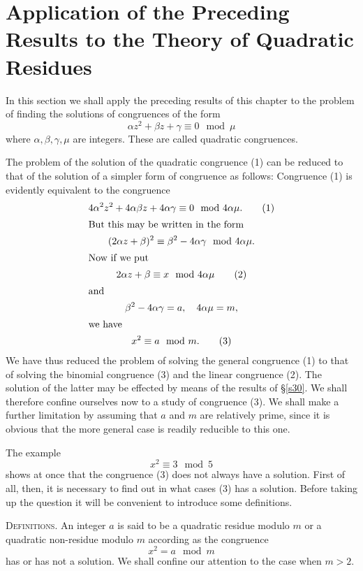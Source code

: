 \documentclass[oneside]{book}
\begin{document}
\section{Application of the Preceding Results to the Theory
of Quadratic Residues}\label{s31}

In this section we shall apply the preceding results of this chapter
to the problem of finding the solutions of congruences of the form
\begin{equation*}
\alpha z^2 + \beta z + \gamma \equiv 0 \mod \mu
\end{equation*}
where $\alpha, \beta, \gamma, \mu$ are integers. These are called
quadratic congruences.

The problem of the solution of the quadratic congruence (1) can be
reduced to that of the solution of a simpler form of congruence as
follows: Congruence (1) is evidently equivalent to the congruence
\begin{gather}
4\alpha^2 z^2 + 4\alpha\beta z + 4\alpha\gamma \equiv
   0 \mod 4\alpha\mu. \tag{1} \\
\intertext{But this may be written in the form}
(2\alpha z + \beta)^2 \equiv \beta^2 - 4\alpha\gamma
      \mod 4\alpha\mu. \notag \\
\intertext{Now if we put}
2\alpha z + \beta\equiv x \mod 4\alpha\mu \tag{2} \\
\intertext{and}
\beta^2 - 4\alpha\gamma = a,\quad 4\alpha\mu = m, \notag \\
\intertext{we have}
x^2 \equiv a\mod m. \tag{3}
\end{gather}
We have thus reduced the problem of solving the general congruence
(1) to that of solving the binomial congruence (3) and the linear
congruence (2). The solution of the latter may be effected by means
of the results of \S \ref{s30}. We shall therefore confine ourselves
now to a study of congruence (3). We shall make a further limitation
by assuming that $a$ and $m$ are relatively prime, since it is
obvious that the more general case is readily reducible to this one.

The example
\begin{equation*}
x^2 \equiv 3 \mod 5
\end{equation*}
shows at once that the congruence (3) does not always have a
solution. First of all, then, it is necessary to find out in what
cases (3) has a solution. Before taking up the question it will be
convenient to introduce some definitions.

\smallskip\textsc{Definitions.} An integer $a$ is said to be a
quadratic residue modulo $m$ or a quadratic non-residue modulo $m$
according as the congruence
\begin{equation*}
x^2 = a \mod m
\end{equation*}
has or has not a solution. We shall confine our attention to the
case when $m > 2$.
\end{document}
